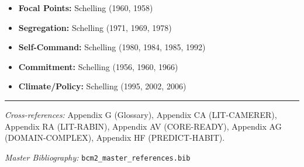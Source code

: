 \begin{itemize}[nosep]
    \item \textbf{Focal Points:} Schelling (1960, 1958)
    \item \textbf{Segregation:} Schelling (1971, 1969, 1978)
    \item \textbf{Self-Command:} Schelling (1980, 1984, 1985, 1992)
    \item \textbf{Commitment:} Schelling (1956, 1960, 1966)
    \item \textbf{Climate/Policy:} Schelling (1995, 2002, 2006)
\end{itemize}



\vspace{1em}
\hrule
\vspace{0.5em}

\noindent\textit{Cross-references:}
Appendix G (Glossary),
Appendix CA (LIT-CAMERER),
Appendix RA (LIT-RABIN),
Appendix AV (CORE-READY),
Appendix AG (DOMAIN-COMPLEX),
Appendix HF (PREDICT-HABIT).

\noindent\textit{Master Bibliography:} \texttt{bcm2\_master\_references.bib}


